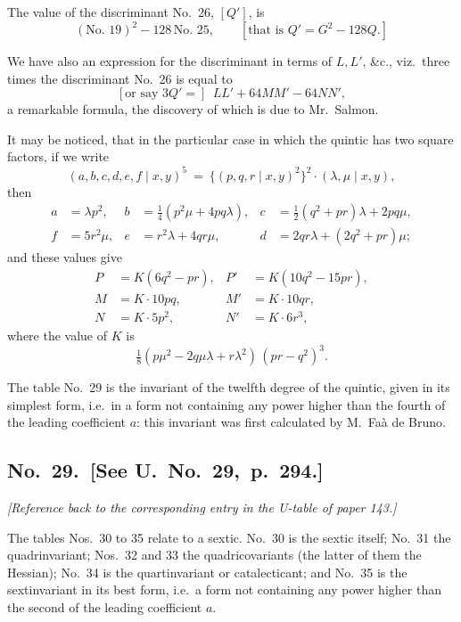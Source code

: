 \documentclass[11pt]{article}
\begin{document}
The value of the discriminant No.\ 26, $[Q']$, is
\[
(\text{No.\ 19})^2 - 128\,\text{No.\ 25}, \qquad [\text{that is } Q' = G^2 - 128 Q.]
\]

We have also an expression for the discriminant in terms of $L, L'$, \&c., viz.\ three times the discriminant No.\ 26 is equal to
\[
[\text{or say } 3Q' = ]\ \ LL' + 64 MM' - 64 NN',
\]
a remarkable formula, the discovery of which is due to Mr.\ Salmon.

\medskip

It may be noticed, that in the particular case in which the quintic has two square factors, if we write
\[
(a, b, c, d, e, f \mid x, y)^5 \ =\ \{(p, q, r \mid x, y)^2\}^2 \cdot (\lambda, \mu \mid x, y),
\]
then
\begin{align*}
a &= \lambda p^2, & b &= \tfrac{1}{4}(p^2 \mu + 4 pq\lambda), & c &= \tfrac{1}{2}(q^2 + pr)\lambda + 2 pq\mu, \\
f &= 5 r^2 \mu, & e &= r^2 \lambda + 4 qr\mu, & d &= 2qr\lambda + (2q^2 + pr)\mu;
\end{align*}
and these values give
\begin{align*}
P  &= K(6q^2 - pr), & P' &= K(10q^2 - 15pr), \\
M  &= K \cdot 10 pq, & M' &= K \cdot 10 qr, \\
N  &= K \cdot 5 p^2, & N' &= K \cdot 6 r^3,
\end{align*}
where the value of $K$ is
\[
\tfrac{1}{8}(p\mu^2 - 2q\mu\lambda + r\lambda^2)\,(pr - q^2)^3.
\]

\bigskip

The table No.\ 29 is the invariant of the twelfth degree of the quintic, given in its simplest form, i.e.\ in a form not containing any power higher than the fourth of the leading coefficient $a$: this invariant was first calculated by M.\ Fa\`a de Bruno.

\subsection*{No.\ 29.\ [See U.\ No.\ 29,\ p.\ 294.]}

\textit{[Reference back to the corresponding entry in the U-table of paper 143.]}

\bigskip

The tables Nos.\ 30 to 35 relate to a sextic. No.\ 30 is the sextic itself; No.\ 31 the quadrinvariant; Nos.\ 32 and 33 the quadricovariants (the latter of them the Hessian); No.\ 34 is the quartinvariant or catalecticant; and No.\ 35 is the sextinvariant in its best form, i.e.\ a form not containing any power higher than the second of the leading coefficient $a$.
\end{document}
